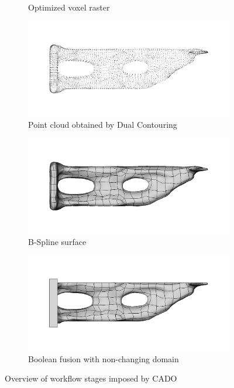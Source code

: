 \begin{figure}
\begin{subfigure}[t]{.49\textwidth}
\caption{Optimized voxel raster}
\end{subfigure}
\begin{subfigure}[t]{.49\textwidth}
\centering
\includegraphics[width=\textwidth]{Pictures/CADO_Overview/Back2CAD4.png}
\caption{Point cloud obtained by Dual Contouring}
\end{subfigure}
\begin{subfigure}[t]{.49\textwidth}
\centering
\includegraphics[width=\textwidth]{Pictures/CADO_Overview/Back2CAD5.png}
\caption{B-Spline surface}
\end{subfigure}
\begin{subfigure}[t]{.49\textwidth}
\centering
\includegraphics[width=\textwidth]{Pictures/CADO_Overview/Back2CAD6.png}
\caption{Boolean fusion with non-changing domain}
\end{subfigure}
\caption{Overview of workflow stages imposed by CADO}
\label{fig:pipeline}
\end{figure}
